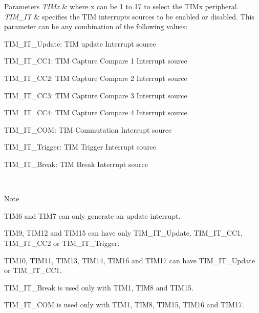 \begin{DoxyParams}{Parameters}
{\em T\+I\+Mx} & where x can be 1 to 17 to select the T\+I\+Mx peripheral. \\
\hline
{\em T\+I\+M\+\_\+\+IT} & specifies the T\+IM interrupts sources to be enabled or disabled. This parameter can be any combination of the following values\+: \begin{DoxyItemize}
\item T\+I\+M\+\_\+\+I\+T\+\_\+\+Update\+: T\+IM update Interrupt source \item T\+I\+M\+\_\+\+I\+T\+\_\+\+C\+C1\+: T\+IM Capture Compare 1 Interrupt source \item T\+I\+M\+\_\+\+I\+T\+\_\+\+C\+C2\+: T\+IM Capture Compare 2 Interrupt source \item T\+I\+M\+\_\+\+I\+T\+\_\+\+C\+C3\+: T\+IM Capture Compare 3 Interrupt source \item T\+I\+M\+\_\+\+I\+T\+\_\+\+C\+C4\+: T\+IM Capture Compare 4 Interrupt source \item T\+I\+M\+\_\+\+I\+T\+\_\+\+C\+OM\+: T\+IM Commutation Interrupt source \item T\+I\+M\+\_\+\+I\+T\+\_\+\+Trigger\+: T\+IM Trigger Interrupt source \item T\+I\+M\+\_\+\+I\+T\+\_\+\+Break\+: T\+IM Break Interrupt source \end{DoxyItemize}
\\
\hline
\end{DoxyParams}
\begin{DoxyNote}{Note}

\begin{DoxyItemize}
\item T\+I\+M6 and T\+I\+M7 can only generate an update interrupt.
\item T\+I\+M9, T\+I\+M12 and T\+I\+M15 can have only T\+I\+M\+\_\+\+I\+T\+\_\+\+Update, T\+I\+M\+\_\+\+I\+T\+\_\+\+C\+C1, T\+I\+M\+\_\+\+I\+T\+\_\+\+C\+C2 or T\+I\+M\+\_\+\+I\+T\+\_\+\+Trigger.
\item T\+I\+M10, T\+I\+M11, T\+I\+M13, T\+I\+M14, T\+I\+M16 and T\+I\+M17 can have T\+I\+M\+\_\+\+I\+T\+\_\+\+Update or T\+I\+M\+\_\+\+I\+T\+\_\+\+C\+C1.
\item T\+I\+M\+\_\+\+I\+T\+\_\+\+Break is used only with T\+I\+M1, T\+I\+M8 and T\+I\+M15.
\item T\+I\+M\+\_\+\+I\+T\+\_\+\+C\+OM is used only with T\+I\+M1, T\+I\+M8, T\+I\+M15, T\+I\+M16 and T\+I\+M17. 
\end{DoxyItemize}
\end{DoxyNote}

